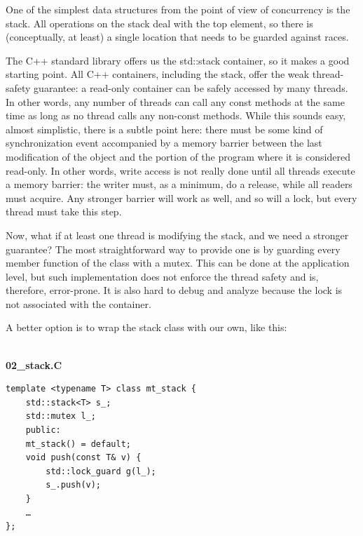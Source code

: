 
One of the simplest data structures from the point of view of concurrency is the stack. All operations on the stack deal with the top element, so there is (conceptually, at least) a single location that needs to be guarded against races.

The C++ standard library offers us the std::stack container, so it makes a good starting point. All C++ containers, including the stack, offer the weak thread-safety guarantee: a read-only container can be safely accessed by many threads. In other words, any number of threads can call any const methods at the same time as long as no thread calls any non-const methods. While this sounds easy, almost simplistic, there is a subtle point here: there must be some kind of synchronization event accompanied by a memory barrier between the last modification of the object and the portion of the program where it is considered read-only. In other words, write access is not really done until all threads execute a memory barrier: the writer must, as a minimum, do a release, while all readers must acquire. Any stronger barrier will work as well, and so will a lock, but every thread must take this step.


Now, what if at least one thread is modifying the stack, and we need a stronger guarantee? The most straightforward way to provide one is by guarding every member function of the class with a mutex. This can be done at the application level, but such implementation does not enforce the thread safety and is, therefore, error-prone. It is also hard to debug and analyze because the lock is not associated with the container. 

A better option is to wrap the stack class with our own, like this:

\hspace*{\fill} \\ %
\noindent
\textbf{02\_stack.C}
\begin{lstlisting}[style=styleCXX]
template <typename T> class mt_stack {
	std::stack<T> s_;
	std::mutex l_;
	public:
	mt_stack() = default;
	void push(const T& v) {
		std::lock_guard g(l_);
		s_.push(v);
	}
	…
};
\end{lstlisting}

